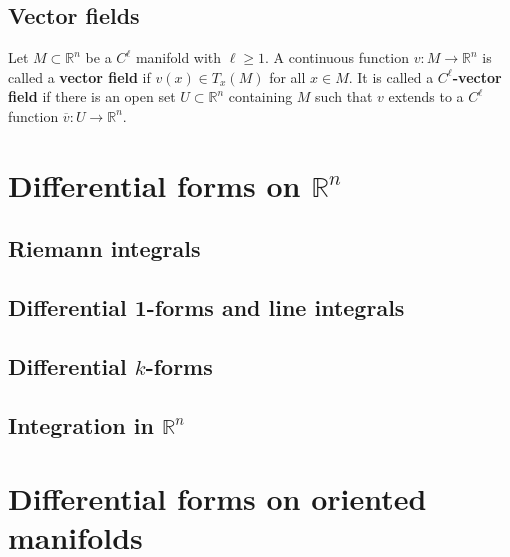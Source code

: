 \documentclass[letter-paper]{tufte-book}
\begin{document}
\section{Vector fields}

Let $M \subset \mathbb{R}^n$ be a $C^\ell$ manifold with $\ell \geq 1$. A
continuous function $v : M \to \mathbb{R}^n$ is called a \textbf{vector field}
if $v(x) \in T_x(M)$ for all $x\in M$. It is called a \textbf{$C^\ell$-vector
field} if there is an open set $U \subset \mathbb{R}^n$ containing $M$ such that
$v$ extends to a $C^\ell$ function $\overline{v} : U \to \mathbb{R}^n$.


\chapter{Differential forms on $\mathbb{R}^n$}


\section{Riemann integrals}


\section{Differential 1-forms and line integrals}


\section{Differential $k$-forms}


\section{Integration in $\mathbb{R}^n$}


\chapter{Differential forms on oriented manifolds}
\end{document}
